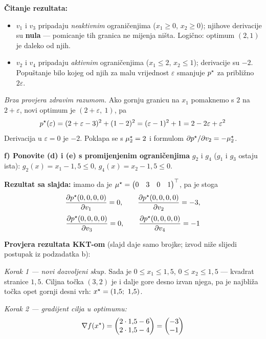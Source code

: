 \begin{zadatak}
\textbf{Čitanje rezultata:}

\begin{itemize}
  \item $v_1$ i $v_3$ pripadaju \emph{neaktivnim} ograničenjima
        ($x_1 \ge 0$, $x_2 \ge 0$); njihove derivacije su \textbf{nula} ---
        pomicanje tih granica ne mijenja ništa. Logično: optimum $(2,1)$ je
        daleko od njih.
  \item $v_2$ i $v_4$ pripadaju \emph{aktivnim} ograničenjima ($x_1 \le 2$,
        $x_2 \le 1$); derivacije su $-2$. Popuštanje bilo kojeg od njih za
        malu vrijednost $\varepsilon$ smanjuje $p^{\star}$ za približno
        $2\varepsilon$.
\end{itemize}

\emph{Brza provjera zdravim razumom.} Ako gornju granicu na $x_1$ pomaknemo s
$2$ na $2 + \varepsilon$, novi optimum je $(2+\varepsilon,\ 1)$, pa
\[
p^{\star}(\varepsilon) = (2+\varepsilon-3)^2 + (1-2)^2
= (\varepsilon - 1)^2 + 1 = 2 - 2\varepsilon + \varepsilon^2
\]
Derivacija u $\varepsilon = 0$ je $-2$. \checkmark Poklapa se s
$\mu_2^{\star} = 2$ i formulom $\partial p^{\star}/\partial v_2 = -\mu_2^{\star}$.

\medskip
\textbf{f) Ponovite (d) i (e) s promijenjenim ograničenjima} $g_2$ i $g_4$
($g_1$ i $g_3$ ostaju ista): $g_2(x) = x_1 - 1{,}5 \le 0$,
$g_4(x) = x_2 - 1{,}5 \le 0$. 

\textbf{Rezultat sa slajda:} imamo da je
$\mu^{\star} = \begin{pmatrix}0 & 3 & 0 & 1\end{pmatrix}^{\top}$, pa je stoga
\[
\frac{\partial p^{\star}(0,0,0,0)}{\partial v_1} = 0, \qquad
\frac{\partial p^{\star}(0,0,0,0)}{\partial v_2} = -3,
\]
\[
\frac{\partial p^{\star}(0,0,0,0)}{\partial v_3} = 0, \qquad
\frac{\partial p^{\star}(0,0,0,0)}{\partial v_4} = -1
\]

\textbf{Provjera rezultata KKT-om} (slajd daje samo brojke; izvod niže slijedi
postupak iz podzadatka b):

\emph{Korak 1 --- novi dozvoljeni skup.} Sada je
$0 \le x_1 \le 1{,}5$, $0 \le x_2 \le 1{,}5$ --- kvadrat stranice $1{,}5$.
Ciljna točka $(3,2)$ je i dalje gore desno izvan njega, pa je najbliža točka
opet gornji desni vrh: $x\opt = (1{,}5;\ 1{,}5)$.

\emph{Korak 2 --- gradijent cilja u optimumu:}
\[
\nabla f(x^{\star}) = \begin{pmatrix}2\cdot1{,}5 - 6\\ 2\cdot1{,}5 - 4\end{pmatrix}
= \begin{pmatrix}-3\\-1\end{pmatrix}
\]


\end{zadatak}
